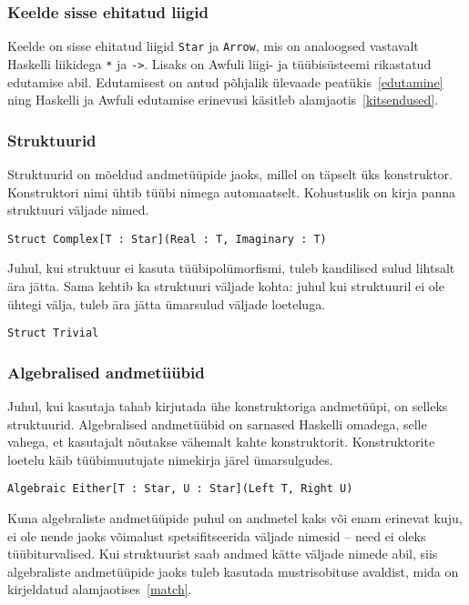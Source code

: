 \documentclass[12pt]{article}
\begin{document}
      \subsubsection{Keelde sisse ehitatud liigid}
        Keelde on sisse ehitatud liigid \verb!Star! ja \verb!Arrow!, mis on analoogsed vastavalt Haskelli liikidega \verb!*! ja \verb!->!. Lisaks on Awfuli liigi- ja tüübisüsteemi rikastatud edutamise abil. Edutamisest on antud põhjalik ülevaade peatükis~\ref{edutamine} ning Haskelli ja Awfuli edutamise erinevusi käsitleb alamjaotis~\ref{kitsendused}.
      \subsubsection{Struktuurid}
        Struktuurid on mõeldud andmetüüpide jaoks, millel on täpselt üks konstruktor. Konstruktori nimi ühtib tüübi nimega automaatselt. Kohustuslik on kirja panna struktuuri väljade nimed.

        \begin{verbatim}Struct Complex[T : Star](Real : T, Imaginary : T)\end{verbatim}

        Juhul, kui struktuur ei kasuta tüübipolümorfismi, tuleb kandilised sulud lihtsalt ära jätta. Sama kehtib ka struktuuri väljade kohta: juhul kui struktuuril ei ole ühtegi välja, tuleb ära jätta ümarsulud väljade loeteluga.

        \begin{verbatim}Struct Trivial\end{verbatim}

      \subsubsection{Algebralised andmetüübid}
        Juhul, kui kasutaja tahab kirjutada ühe konstruktoriga andmetüüpi, on selleks struktuurid. Algebralised andmetüübid on sarnased Haskelli omadega, selle vahega, et kasutajalt nõutakse vähemalt kahte konstruktorit. Konstruktorite loetelu käib tüübimuutujate nimekirja järel ümarsulgudes.

        \begin{verbatim}Algebraic Either[T : Star, U : Star](Left T, Right U)\end{verbatim}

        Kuna algebraliste andmetüüpide puhul on andmetel kaks või enam erinevat kuju, ei ole nende jaoks võimalust spetsifitseerida väljade nimesid -- need ei oleks tüübiturvalised. Kui struktuurist saab andmed kätte väljade nimede abil, siis algebraliste andmetüüpide jaoks tuleb kasutada mustrisobituse avaldist, mida on kirjeldatud alamjaotises~\ref{match}.
\end{document}
